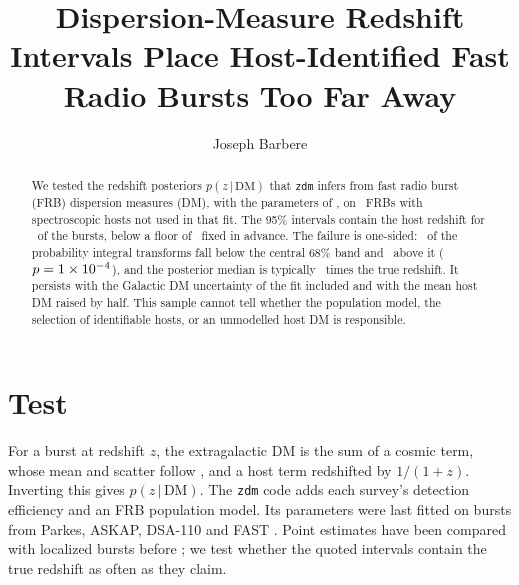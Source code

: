 \documentclass[twocolumn]{aastex631}
\newcommand{\code}[1]{\texttt{#1}}
\begin{document}
\title{Dispersion-Measure Redshift Intervals Place Host-Identified Fast Radio Bursts Too Far Away}
\author[0009-0008-3289-4447]{Joseph Barbere}

\begin{abstract}
We tested the redshift posteriors $p(z\,|\,\mathrm{DM})$ that \code{zdm} infers from fast radio
burst (FRB) dispersion measures (DM), with the parameters of \citet{hoffmann2025}, on
\dmzRealNCert\ FRBs with spectroscopic hosts not used in that fit. The 95\% intervals contain
the host redshift for \dmzRealEOneCovNinetyFive\ of the bursts, below a floor of
\dmzSynBandLoNinetyFive\ fixed in advance. The failure is one-sided: \dmzRealEOneTailLo\ of the
probability integral transforms fall below the central 68\% band and \dmzRealEOneTailHi\ above
it ($p=1\times10^{-4}$), and the posterior median is typically \dmzRealRatioMed\ times the true
redshift. It persists with the Galactic DM uncertainty of the fit included and with the mean host
DM raised by half. This sample cannot tell whether the population model, the selection of
identifiable hosts, or an unmodelled host DM is responsible.
\end{abstract}


\section{Test}
\label{sec:test}
For a burst at redshift $z$, the extragalactic DM is the sum of a cosmic term, whose mean and
scatter follow \citet{macquart2020}, and a host term redshifted by $1/(1+z)$. Inverting this
gives $p(z\,|\,\mathrm{DM})$. The \code{zdm} code \citep{james2022,zdm} adds each survey's
detection efficiency and an FRB population model. Its parameters were last fitted on bursts from
Parkes, ASKAP, DSA-110 and FAST \citep{hoffmann2025}. Point estimates have been compared with
localized bursts before \citep{cordes2022}; we test whether the quoted intervals contain the
true redshift as often as they claim.
\end{document}
